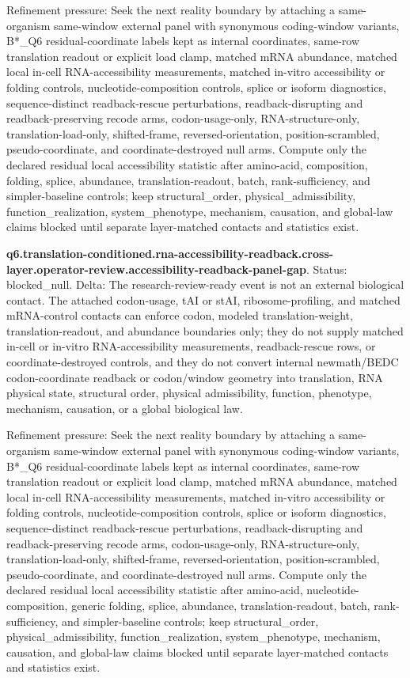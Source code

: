 Refinement pressure: Seek the next reality boundary by attaching a same-organism same-window external panel with synonymous coding-window variants, B*\_Q6 residual-coordinate labels kept as internal coordinates, same-row translation readout or explicit load clamp, matched mRNA abundance, matched local in-cell RNA-accessibility measurements, matched in-vitro accessibility or folding controls, nucleotide-composition controls, splice or isoform diagnostics, sequence-distinct readback-rescue perturbations, readback-disrupting and readback-preserving recode arms, codon-usage-only, RNA-structure-only, translation-load-only, shifted-frame, reversed-orientation, position-scrambled, pseudo-coordinate, and coordinate-destroyed null arms. Compute only the declared residual local accessibility statistic after amino-acid, composition, folding, splice, abundance, translation-readout, batch, rank-sufficiency, and simpler-baseline controls; keep structural\_order, physical\_admissibility, function\_realization, system\_phenotype, mechanism, causation, and global-law claims blocked until separate layer-matched contacts and statistics exist.

\textbf{q6.translation-conditioned.rna-accessibility-readback.cross-layer.operator-review.accessibility-readback-panel-gap}. Status: blocked\_null. Delta: The research-review-ready event is not an external biological contact. The attached codon-usage, tAI or stAI, ribosome-profiling, and matched mRNA-control contacts can enforce codon, modeled translation-weight, translation-readout, and abundance boundaries only; they do not supply matched in-cell or in-vitro RNA-accessibility measurements, readback-rescue rows, or coordinate-destroyed controls, and they do not convert internal newmath/BEDC codon-coordinate readback or codon/window geometry into translation, RNA physical state, structural order, physical admissibility, function, phenotype, mechanism, causation, or a global biological law.

Refinement pressure: Seek the next reality boundary by attaching a same-organism same-window external panel with synonymous coding-window variants, B*\_Q6 residual-coordinate labels kept as internal coordinates, same-row translation readout or explicit load clamp, matched mRNA abundance, matched local in-cell RNA-accessibility measurements, matched in-vitro accessibility or folding controls, nucleotide-composition controls, splice or isoform diagnostics, sequence-distinct readback-rescue perturbations, readback-disrupting and readback-preserving recode arms, codon-usage-only, RNA-structure-only, translation-load-only, shifted-frame, reversed-orientation, position-scrambled, pseudo-coordinate, and coordinate-destroyed null arms. Compute only the declared residual local accessibility statistic after amino-acid, nucleotide-composition, generic folding, splice, abundance, translation-readout, batch, rank-sufficiency, and simpler-baseline controls; keep structural\_order, physical\_admissibility, function\_realization, system\_phenotype, mechanism, causation, and global-law claims blocked until separate layer-matched contacts and statistics exist.


